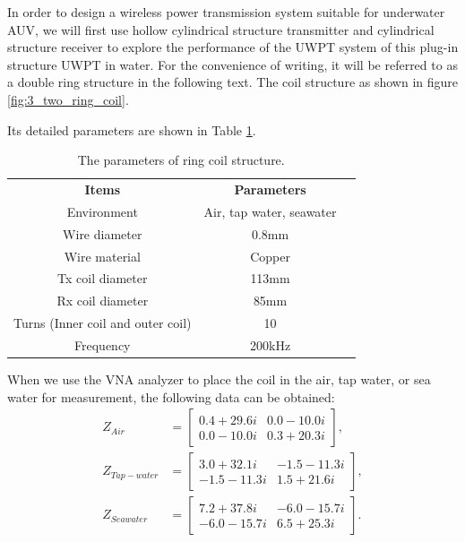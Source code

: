 In order to design a wireless power transmission system suitable for underwater AUV, we will first use hollow cylindrical structure transmitter and cylindrical structure receiver to explore the performance of the UWPT system of this plug-in structure UWPT in water. For the convenience of writing, it will be referred to as a double ring structure in the following text. The coil structure as shown in figure \ref{fig:3_two_ring_coil}.

Its detailed parameters are shown in Table \ref{table:ring coil parameters}.

\begin{table}[htbp]
    \centering
    \caption{The parameters of ring coil structure.}
    \begin{tabular}{ c|cc }
        \thickhline
        \textbf{Items}                    & \textbf{Parameters}      \\
        \thickhline
        Environment                       & Air, tap water, seawater \\ \hline
        Wire diameter                     & 0.8mm                    \\ \hline
        Wire material                     & Copper                   \\
        \hline
        Tx coil diameter                  & 113mm                    \\ \hline
        Rx coil diameter                  & 85mm                     \\ \hline
        Turns (Inner coil and outer coil) & 10                       \\ \hline
        Frequency                         & 200kHz                   \\ \hline
    \end{tabular}
    \label{table:ring coil parameters}
\end{table}

When we use the VNA analyzer to place the coil in the air, tap water, or sea water for measurement, the following data can be obtained:
\begin{equation*}
    \begin{aligned}
        Z_{Air}       & =
        \begin{bmatrix}
            0.4 +29.6i & 0.0 -10.0i \\
            0.0 -10.0i & 0.3 +20.3i
        \end{bmatrix}, \\
        Z_{Tap-water} & =
        \begin{bmatrix}
            3.0 +32.1i  & -1.5 -11.3i \\
            -1.5 -11.3i & 1.5 +21.6i
        \end{bmatrix}, \\
        Z_{Seawater}  & =
        \begin{bmatrix}
            7.2 +37.8i  & -6.0 -15.7i \\
            -6.0 -15.7i & 6.5 +25.3i
        \end{bmatrix}.
    \end{aligned}
\end{equation*}


